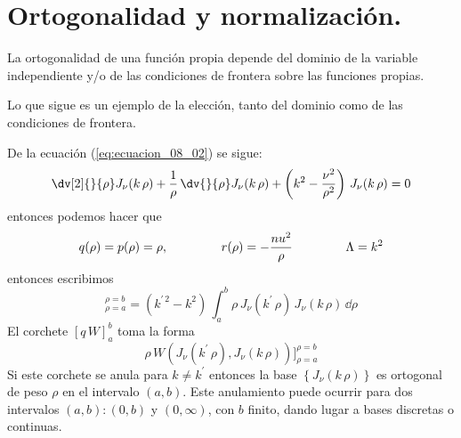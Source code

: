\section{Ortogonalidad y normalización.}
La ortogonalidad de una función propia depende del dominio de la variable independiente y/o de las condiciones de frontera sobre las funciones propias.
\par
Lo que sigue es un ejemplo de la elección, tanto del dominio como de las condiciones de frontera.
\par
De la ecuación (\ref{eq:ecuacion_08_02}) se sigue:
\[ \dv[2]{}{\rho} J_{\nu} (k \, \rho) + \dfrac{1}{\rho} \, \dv{}{\rho} J_{\nu} (k \, \rho) + \left( k^{2} - \dfrac{\nu^{2}}{\rho^{2}} \right) \, J_{\nu} (k \, \rho) = 0\]
entonces podemos hacer que
\[ q(\rho) = p(\rho) = \rho, \hspace{1.5cm} r(\rho) = -\dfrac{nu^{2}}{\rho} \hspace{1.5cm} \Lambda = k^{2} \]
entonces escribimos
\begin{equation}
[ \rho \, W(J_{\nu}(k^{\prime} \, \rho), J_{\nu} (k \, \rho))]_{\rho=a}^{\rho=b} = (k^{\prime \, 2} - k^{2}) \, \int_{a}^{b} \rho \, J_{\nu}(k^{\prime} \, \rho) \, J_{\nu} (k \, \rho) \, \dd \rho
\label{eq:ecuacion_08_08}
\end{equation}
El corchete $[q \, W]_{a}^{b}$ toma la forma
\[ \rho \, W(J_{\nu}(k^{\prime} \, \rho), J_{\nu} (k \, \rho))]_{\rho=a}^{\rho=b} \]
Si este corchete se anula para $k \neq k^{\prime}$ entonces la base $\left\{ J_{\nu} (k \, \rho) \right\}$ es ortogonal de peso $\rho$ en el intervalo $(a,b)$. Este anulamiento puede ocurrir para dos intervalos $(a,b): (0, b)$ y $(0, \infty)$, con $b$ finito, dando lugar a bases discretas o continuas.
